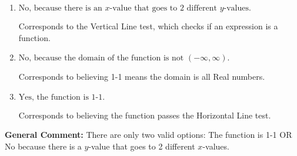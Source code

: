 \documentclass{extbook}[14pt]
\begin{document}
\begin{enumerate}
{\begin{enumerate}[label=\Alph*.]
Corresponds to believing 1-1 means the range is all Real numbers.
\item \( \text{No, because there is an $x$-value that goes to 2 different $y$-values.} \)

Corresponds to the Vertical Line test, which checks if an expression is a function.
\item \( \text{No, because the domain of the function is not $(-\infty, \infty)$.} \)

Corresponds to believing 1-1 means the domain is all Real numbers.
\item \( \text{Yes, the function is 1-1.} \)

Corresponds to believing the function passes the Horizontal Line test.
\end{enumerate}

\textbf{General Comment:} There are only two valid options: The function is 1-1 OR No because there is a $y$-value that goes to 2 different $x$-values.
}
\end{enumerate}
\end{document}
